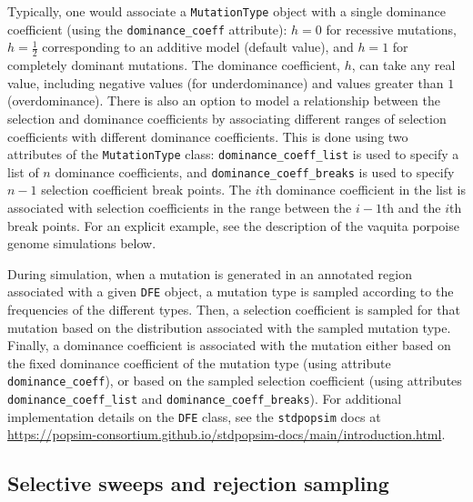 \documentclass[hidelinks]{article}
\newcommand{\stdpopsim}{\texttt{stdpopsim}\xspace}
\begin{document}
    Typically, one would associate a \texttt{MutationType} object with a single dominance coefficient (using the \texttt{dominance\_coeff} attribute):
    $h=0$ for recessive mutations, $h=\frac 12$ corresponding to an additive model (default value), and $h=1$ for completely dominant mutations.
    The dominance coefficient, $h$,  can take any real value, including negative values (for underdominance)
    and values greater than $1$ (overdominance).
    There is also an option to model a relationship between the selection and dominance coefficients
    by associating different ranges of selection coefficients with different dominance coefficients.
    This is done using two attributes of the \texttt{MutationType} class:
    \texttt{dominance\_coeff\_list} is used to specify a list of $n$ dominance coefficients,
    and \texttt{dominance\_coeff\_breaks} is used to specify $n-1$ selection coefficient break points.
    The $i$th dominance coefficient in the list is associated with selection coefficients in the range
    between the $i-1$th and the $i$th break points.
    For an explicit example, see the description of the vaquita porpoise genome simulations below.
    
    During simulation, when a mutation is generated in an annotated region associated with a given \texttt{DFE} object,
    a mutation type is sampled according to the frequencies of the different types.
    Then, a selection coefficient is sampled for that mutation based on the distribution associated with the sampled mutation type.
    Finally, a dominance coefficient is associated with the mutation either based on the fixed dominance coefficient of the mutation type
    (using attribute \texttt{dominance\_coeff}), or based on the sampled selection coefficient
    (using attributes \texttt{dominance\_coeff\_list} and \texttt{dominance\_coeff\_breaks}).    
    For additional implementation details on the \texttt{DFE} class, see the {\stdpopsim docs} at
    \url{https://popsim-consortium.github.io/stdpopsim-docs/main/introduction.html}.


    \subsection*{Selective sweeps and rejection sampling}

\end{document}
